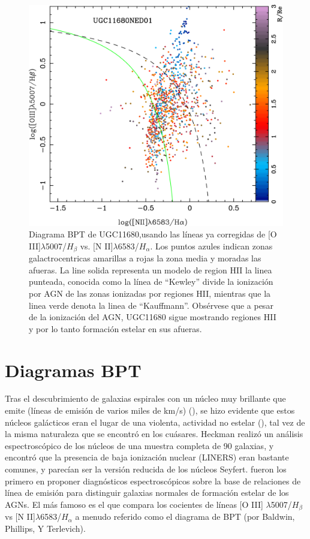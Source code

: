 \begin{figure}[!ht]
  \centering
  \includegraphics[scale=0.2]{1UGC11680NED01_proc_elines4.png}
  \caption[ Diagrama bpt UGC11680]
   {Diagrama BPT de  UGC11680,usando las líneas ya corregidas de [O III]$\lambda$5007/$H_{\beta}$ vs.
[N II]$\lambda$6583/$H_{\alpha}$. Los puntos azules indican zonas galactrocentricas amarillas a rojas la zona media y moradas las afueras. La line solida representa un modelo de region HII la linea punteada, conocida como la línea de ``Kewley'' divide la ionización por AGN de las zonas ionizadas por regiones HII, mientras que la linea verde denota la linea de  ``Kauffmann''. Obsérvese que a pesar de la ionización del AGN, UGC11680 sigue mostrando regiones HII y por lo tanto formación estelar en sus afueras. }
\label{bpt}
\end{figure}


\section{Diagramas BPT}

\bigskip

Tras el descubrimiento de galaxias espirales con un núcleo muy brillante que emite
(líneas de emisión de varios miles de km/s) (\citet{seyfert1941}),
se hizo evidente que estos núcleos galácticos eran el lugar de una violenta,
actividad no estelar (\citet{burbidge1963}), tal vez de la misma naturaleza que se encontró en los cuásares.
Heckman  realizó un análisis espectroscópico de los núcleos de una muestra completa
de 90 galaxias, y  encontró que la presencia de baja ionización nuclear (LINERS) eran bastante comunes, y parecían ser
la versión reducida de los núcleos Seyfert. \cite{baldwin1981} fueron los
primero en proponer diagnósticos espectroscópicos sobre la base de relaciones de línea de emisión
para distinguir galaxias normales  de formación estelar de los AGNs. El más famoso es el que compara los cocientes de líneas
[O III] $\lambda$5007/$H_{\beta}$ vs [N II]$\lambda$6583/$H_{\alpha}$ a menudo referido como el diagrama de BPT (por Baldwin, Phillips,
Y Terlevich).

